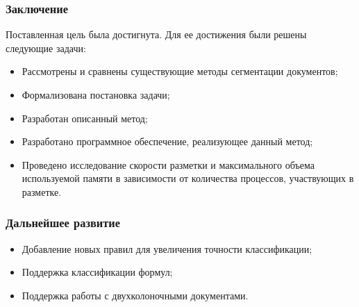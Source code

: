 \documentclass[gray]{beamer}
\begin{document}
\begin{frame}
    \frametitle{Заключение}

    Поставленная цель была достигнута.
    Для ее достижения были решены следующие задачи:
    \begin{itemize}
        \item Рассмотрены и сравнены существующие методы сегментации документов;
        \item Формализована постановка задачи;
        \item Разработан описанный метод;
        \item Разработано программное обеспечение, реализующее данный метод;
        \item Проведено исследование скорости разметки и максимального объема используемой памяти в зависимости от количества процессов, участвующих в разметке.
    \end{itemize}
\end{frame}

\begin{frame}
    \frametitle{Дальнейшее развитие}
    \begin{itemize}
        \item Добавление новых правил для увеличения точности классификации;
        \item Поддержка классификации формул;
        \item Поддержка работы с двухколоночными документами.
    \end{itemize}
\end{frame}
\end{document}
